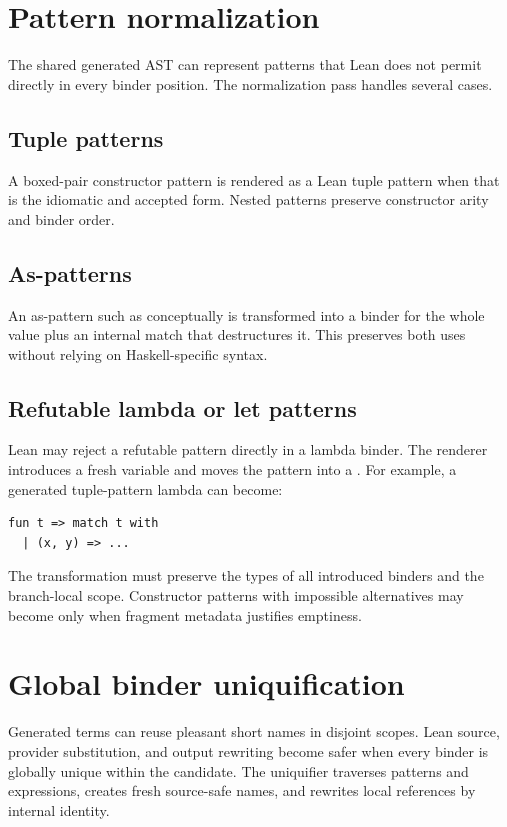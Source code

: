 \documentclass[10pt,letterpaper,oneside]{report}
\newcommand{\code}[1]{\texttt{\detokenize{#1}}}
\begin{document}
\section{Pattern normalization}\label{sec:pattern-normalization}

The shared generated AST can represent patterns that Lean does not permit directly in every binder position. The normalization pass handles several cases.

\subsection{Tuple patterns}

A boxed-pair constructor pattern is rendered as a Lean tuple pattern when that is the idiomatic and accepted form. Nested patterns preserve constructor arity and binder order.

\subsection{As-patterns}

An as-pattern such as conceptually \code{x@p} is transformed into a binder for the whole value plus an internal match that destructures it. This preserves both uses without relying on Haskell-specific syntax.

\subsection{Refutable lambda or let patterns}

Lean may reject a refutable pattern directly in a lambda binder. The renderer introduces a fresh variable and moves the pattern into a \code{match}. For example, a generated tuple-pattern lambda can become:

\begin{lstlisting}[language=Leanish]
fun t => match t with
  | (x, y) => ...
\end{lstlisting}

The transformation must preserve the types of all introduced binders and the branch-local scope. Constructor patterns with impossible alternatives may become \code{nomatch} only when fragment metadata justifies emptiness.

\section{Global binder uniquification}

Generated terms can reuse pleasant short names in disjoint scopes. Lean source, provider substitution, and output rewriting become safer when every binder is globally unique within the candidate. The uniquifier traverses patterns and expressions, creates fresh source-safe names, and rewrites local references by internal identity.
\end{document}
